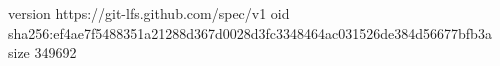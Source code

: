 version https://git-lfs.github.com/spec/v1
oid sha256:ef4ae7f5488351a21288d367d0028d3fc3348464ac031526de384d56677bfb3a
size 349692
